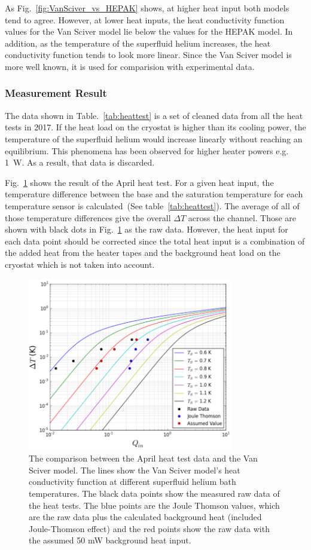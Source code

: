 As Fig.~\ref{fig:VanSciver_vs_HEPAK} shows, at higher heat input both
models tend to agree. However, at lower heat inputs, the heat
conductivity function values for the Van Sciver model lie below the
values for the HEPAK model. In addition, as the temperature of the
superfluid helium increases, the heat conductivity function tends to
look more linear. Since the Van Sciver model is more well known, it is
used for comparision with experimental data.

\subsubsection{Measurement Result}
The data shown in Table.~\ref{tab:heattest} is a set of cleaned data
from all the heat tests in 2017. If the heat load on the cryostat is
higher than its cooling power, the temperature of the superfluid
helium would increase linearly without reaching an equilibrium. This
phenomena has been observed for higher heater powers e.g. 1~W. As a
result, that data is discarded.


Fig.~\ref{fig:April_Data} shows the result of the April heat test.
For a given heat input, the temperature difference between the base
and the saturation temperature for each temperature sensor is
calculated~(See table~\ref{tab:heattest}). The average of all of those
temperature differences give the overall $\Delta T$ across the
channel. Those are shown with black dots in Fig.~\ref{fig:April_Data}
as the raw data. However, the heat input for each data point should be
corrected since the total heat input is a combination of the added
heat from the heater tapes and the background heat load on the
cryostat which is not taken into account.


\begin{figure}[h!]
  \centering \includegraphics[width=0.8\textwidth]{April_Data.png}
  \caption{The comparison between the April heat test data and the Van
    Sciver model. The lines show the Van Sciver model's heat
    conductivity function at different superfluid helium bath
    temperatures. The black data points show the measured raw data of
    the heat tests. The blue points are the Joule Thomson values,
    which are the raw data plus the calculated background heat
    (included Joule-Thomson effect) and the red points show the raw
    data with the assumed 50 mW background heat input. }
\label{fig:April_Data}
\end{figure}


